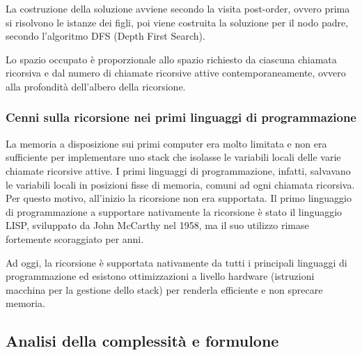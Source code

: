 La costruzione della soluzione avviene secondo la visita post-order, ovvero prima si risolvono le istanze dei figli, poi
viene costruita la soluzione per il nodo padre, secondo l'algoritmo DFS (Depth First Search).

Lo spazio occupato è proporzionale allo spazio richiesto da ciascuna chiamata ricorsiva e dal numero di chiamate ricorsive
attive contemporaneamente, ovvero alla profondità dell'albero della ricorsione.

\subsubsection*{Cenni sulla ricorsione nei primi linguaggi di programmazione}
La memoria a disposizione sui primi computer era molto limitata e non era sufficiente per implementare uno stack che isolasse
le variabili locali delle varie chiamate ricorsive attive. I primi linguaggi di programmazione, infatti, salvavano le variabili
locali in posizioni fisse di memoria, comuni ad ogni chiamata ricorsiva. Per questo motivo, all'inizio la ricorsione non era
supportata. Il primo linguaggio di programmazione a supportare nativamente la ricorsione è stato il linguaggio LISP, sviluppato
da John McCarthy nel 1958, ma il suo utilizzo rimase fortemente scoraggiato per anni.

Ad oggi, la ricorsione è supportata nativamente da tutti i principali linguaggi di programmazione ed esistono ottimizzazioni
a livello hardware (istruzioni macchina per la gestione dello stack) per renderla efficiente e non sprecare memoria.

\subsection{Analisi della complessità e formulone}
